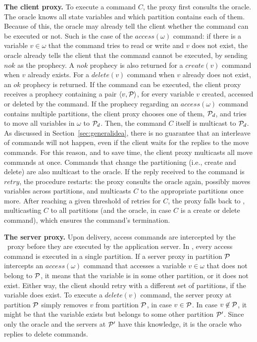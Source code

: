 \textbf{The client proxy.} To execute a command $C$, the proxy first consults the oracle.
The oracle knows all state variables and which partition contains each of them.
Because of this, the oracle may already tell the client whether the command can be executed or not.
Such is the case of the $access(\omega)$ command: if there is a variable $v \in \omega$ that the command tries to read or write and $v$ does not exist, the oracle already tells the client that the command cannot be executed, by sending $nok$ as the prophecy.
A $nok$ prophecy is also returned for a $create(v)$ command when $v$ already exists.
For a $delete(v)$ command when $v$ already does not exist, an $ok$ prophecy is returned.
If the command can be executed, the client proxy receives a prophecy containing a pair $\langle v, \mathcal{P} \rangle$, for every variable $v$ created, accessed or deleted by the command.
If the prophecy regarding an $access(\omega)$ command contains multiple partitions, the client proxy chooses one of them, $\mathcal{P}_d$, and tries to move all variables in $\omega$ to $\mathcal{P}_d$.
Then, the command $C$ itself is multicast to $\mathcal{P}_d$.
As discussed in Section~\ref{sec:generalidea}, there is no guarantee that an interleave of commands will not happen, even if the client waits for the replies to the move commands.
For this reason, and to save time, the client proxy multicasts all move commands at once.
Commands that change the partitioning (i.e., create and delete) are also multicast to the oracle.
If the reply received to the command is $retry$, the procedure restarts: the proxy consults the oracle again, possibly moves variables across partitions, and multicasts $C$ to the appropriate partitions once more.
After reaching a given threshold of retries for $C$, the proxy falls back to \ssmr{}, multicasting $C$ to all partitions (and the oracle, in case $C$ is a create or delete command), which ensures the command's termination.


\textbf{The server proxy.} Upon delivery, access commands are intercepted by the \dssmr\ proxy before they are executed by the application server.
In \dssmr{}, every access command is executed in a single partition.
If a server proxy in partition $\mathcal{P}$ intercepts an $access(\omega)$ command that accesses a variable $v \in \omega$ that does not belong to $\mathcal{P}$, it means that the variable is in some other partition, or it does not exist.
Either way, the client should retry with a different set of partitions, if the variable does exist.
To execute a $delete(v)$ command, the server proxy at partition $\mathcal{P}$ simply removes $v$ from partition $\mathcal{P}$, in case $v \in \mathcal{P}$.
In case $v \not\in \mathcal{P}$, it might be that the variable exists but belongs to some other partition $\mathcal{P}'$.
Since only the oracle and the servers at $\mathcal{P}'$ have this knowledge, it is the oracle who replies to delete commands.

